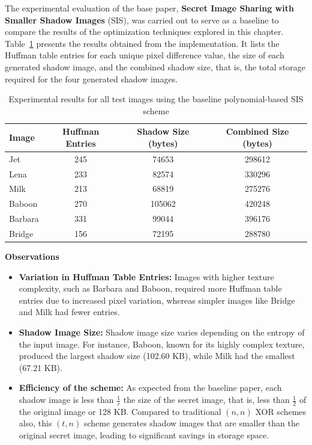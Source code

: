 The experimental evaluation of the base paper, \textbf{Secret Image Sharing with Smaller Shadow Images} (SIS), was carried out to serve as a baseline to compare the results of the optimization techniques explored in this chapter. Table~\ref{tab:baseline} presents the results obtained from the implementation. It lists the Huffman table entries for each unique pixel difference value, the size of each generated shadow image, and the combined shadow size, that is, the total storage required for the four generated shadow images.
 
\begin{table}[H]
\centering
\small
\setlength{\tabcolsep}{4pt}
\caption{Experimental results for all test images using the baseline polynomial-based SIS scheme}
\label{tab:baseline}
\begin{tabular}{lccc}
\toprule
Image & Huffman Entries & Shadow Size (bytes) & Combined Size (bytes) \\
\midrule
Jet     & 245 & 74653  & 298612 \\
Lena    & 233 & 82574  & 330296 \\
Milk    & 213 & 68819  & 275276 \\
Baboon  & 270 & 105062 & 420248 \\
Barbara & 331 & 99044  & 396176 \\
Bridge  & 156 & 72195  & 288780 \\
\bottomrule
\end{tabular}
\end{table}
 
\textbf{Observations}
\begin{itemize}
    \item \textbf{Variation in Huffman Table Entries:} Images with higher texture complexity, such as Barbara and Baboon, required more Huffman table entries due to increased pixel variation, whereas simpler images like Bridge and Milk had fewer entries.
    \item \textbf{Shadow Image Size:} Shadow image size varies depending on the entropy of the input image. For instance, Baboon, known for its highly complex texture, produced the largest shadow size (102.60 KB), while Milk had the smallest (67.21 KB).
    \item \textbf{Efficiency of the scheme:} As expected from the baseline paper, each shadow image is less than $\frac{1}{r}$ the size of the secret image, that is, less than $\frac{1}{2}$ of the original image or 128 KB. Compared to traditional $(n, n)$ XOR schemes also, this $(t, n)$ scheme generates shadow images that are smaller than the original secret image, leading to significant savings in storage space.
\end{itemize}
 

